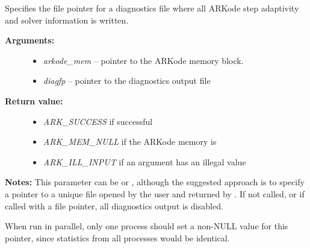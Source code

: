 \documentclass[letterpaper,10pt,english]{sphinxmanual}
\begin{document}
\begin{fulllineitems}
\label{c_interface/User_callable:c.ARKodeSetDiagnostics}
Specifies the file pointer for a diagnostics file where
all ARKode step adaptivity and solver information is written.
\begin{description}
\item[{\textbf{Arguments:}}] \leavevmode\begin{itemize}
\item {} 
\emph{arkode\_mem} -- pointer to the ARKode memory block.

\item {} 
\emph{diagfp} -- pointer to the diagnostics output file

\end{itemize}

\item[{\textbf{Return value:}}] \leavevmode\begin{itemize}
\item {} 
\emph{ARK\_SUCCESS} if successful

\item {} 
\emph{ARK\_MEM\_NULL} if the ARKode memory is 

\item {} 
\emph{ARK\_ILL\_INPUT} if an argument has an illegal value

\end{itemize}

\end{description}

\textbf{Notes:} This parameter can be  or , although the
suggested approach is to specify a pointer to a unique file opened
by the user and returned by .  If not called, or if called
with a  file pointer, all diagnostics output is disabled.

When run in parallel, only one process should set a non-NULL value
for this pointer, since statistics from all processes would be
identical.

\end{fulllineitems}

\end{document}
